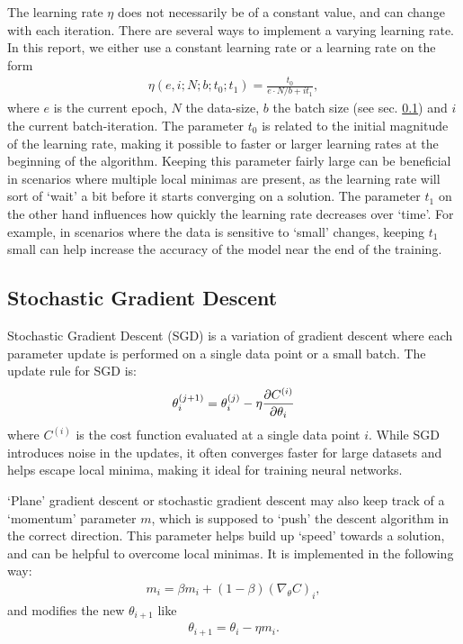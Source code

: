 \documentclass[%
reprint,s
amsmath,amssymb,
aps,
]{revtex4-2}
\begin{document}
The learning rate \(\eta\) does not necessarily be of a constant value, and can change with each iteration. There are several ways to implement a varying learning rate. In this report, we either use a constant learning rate or a learning rate on the form 
\begin{align} \label{eq:varyin_learning_rate}
	\eta(e,i;N;b;t_0;t_1) = \frac{t_0}{e\cdot N/b + i t_1},
\end{align}
where \(e\) is the current epoch, \(N\) the data-size, \(b\) the batch size (see sec. \ref{sec:stochastic_gradient_descent}) and \(i\) the current batch-iteration. The parameter \(t_0\) is related to the initial magnitude of the learning rate, making it possible to faster or larger learning rates at the beginning of the algorithm. Keeping this parameter fairly large can be beneficial in scenarios where multiple local minimas are present, as the learning rate will sort of  `wait' a bit before it starts converging on a solution. The parameter \(t_1\) on the other hand influences how quickly the learning rate decreases over `time'. For example, in scenarios where the data is sensitive to `small' changes, keeping \(t_1\) small can help increase the accuracy of the model near the end of the training. 

\subsection{Stochastic Gradient Descent} \label{sec:stochastic_gradient_descent}
Stochastic Gradient Descent (SGD) is a variation of gradient descent where each parameter update is performed on a single data point or a small batch. The update rule for SGD is:
\[
\theta_i^{(j+1)} = \theta_i^{(j)} - \eta \pdv{C^{(i)}}{\theta_i}
\]
where $C^{(i)}$ is the cost function evaluated at a single data point $i$. While SGD introduces noise in the updates, it often converges faster for large datasets and helps escape local minima, making it ideal for training neural networks.

`Plane' gradient descent or stochastic gradient descent may also keep track of a `momentum' parameter \(m\), which is supposed to `push' the descent algorithm in the correct direction. This parameter helps build up `speed' towards a solution, and can be helpful to overcome local minimas. It is implemented in the following way:
\begin{align}
	m_i = \beta m_i + (1-\beta)(\nabla_{\theta}C)_i,
\end{align}
and modifies the new \(\theta_{i+1}\) like 
\begin{align}
	\theta_{i+1} = \theta_{i} - \eta m_i.
\end{align}
\end{document}
